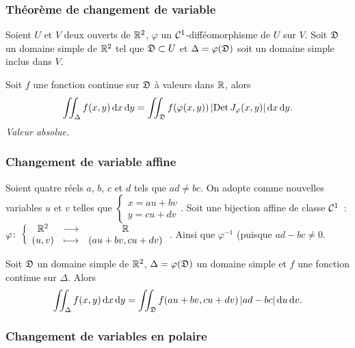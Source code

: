 \subsubsection{Théorème de changement de variable}

\begin{theo}
  Soient \(U\) et \(V\) deux ouverts de \(\mathbb{R}^2\), \(\varphi\) un \(\mathcal{C}^{1}\)-difféomorphisme de \(U\) sur \(V\). Soit \(\mathfrak{D}\) un domaine simple de \(\mathbb{R}^2\) tel que \(\mathfrak{D} \subset U\) et \(\Delta = \varphi(\mathfrak{D})\) soit un domaine simple inclus dans \(V\).

  Soit \(f\) une fonction continue sur \(\mathfrak{D}\) à valeurs dans \(\mathbb{R}\), alors
  \begin{equation}
    \iint_\Delta f(x,y)\mathop{}\mathopen{}\mathrm{d} x \mathop{}\mathopen{}\mathrm{d} y = \iint_{\mathfrak{D}} f(\varphi(x,y)) \left\lvert\operatorname{Det} J_\varphi(x,y)\right\rvert\mathop{}\mathopen{}\mathrm{d} x \mathop{}\mathopen{}\mathrm{d} y.
  \end{equation}
  \emph{Valeur absolue.}
\end{theo}

\subsubsection{Changement de variable affine}

\begin{theo}
  Soient quatre réels \(a\), \(b\), \(c\) et \(d\) tels que \(ad \neq bc\). On adopte comme nouvelles variables \(u\) et \(v\) telles que \(\begin{cases} x=au+bv \\ y=cu+dv \end{cases}\). Soit une bijection affine de classe \(\mathcal{C}^{1}\)~: \(\varphi\colon \left\{\begin{array}{ccc} \mathbb{R}^2 & \longrightarrow &\mathbb{R}\\ (u,v) & \longmapsto & (au+bv, cu+dv) \end{array} \right.\). Ainsi que \(\varphi^{-1}\) (puisque \(ad-bc\neq 0\).

Soit \(\mathfrak{D}\) un domaine simple de \(\mathbb{R}^2\), \(\Delta=\varphi(\mathfrak{D})\) un domaine simple et \(f\) une fonction continue sur \(\Delta\). Alors
\begin{equation}
  \iint_\Delta f(x,y)\mathop{}\mathopen{}\mathrm{d} x \mathop{}\mathopen{}\mathrm{d} y = \iint_{\mathfrak{D}} f(au+bv, cu+dv) \left\lvert ad-bc\right\rvert\mathop{}\mathopen{}\mathrm{d} u \mathop{}\mathopen{}\mathrm{d} v.
\end{equation}
\end{theo}

\subsubsection{Changement de variables en polaire}

